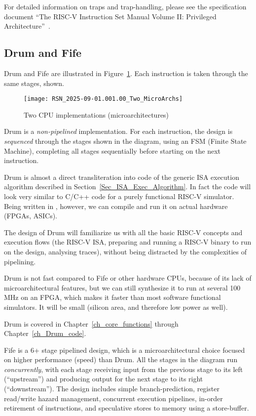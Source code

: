 For detailed information on traps and trap-handling, please see the
specification document ``The RISC-V Instruction Set Manual Volume II:
Privileged Architecture''~\cite{RISCV_Priv_2021_12_03}.


\subsection{Drum and Fife}

Drum and Fife are illustrated in
Figure~\ref{Fig_Two_Microarchitectures}.  Each instruction is taken
through the same stages, shown.
\begin{figure}[htbp]
  \centerline{\texttt{[image: RSN\_2025-09-01.001.00\_Two\_MicroArchs]}}
  \caption{\label{Fig_Two_Microarchitectures}Two CPU implementations (microarchitectures)}
\end{figure}

Drum is a \emph{non-pipelined} implementation.  For each instruction,
the design is \emph{sequenced} through the stages shown in the
diagram, using an FSM (Finite State Machine), completing all stages
sequentially before starting on the next instruction.

Drum is almost a direct transliteration into {\BSV} code of the generic
ISA execution algorithm described in
Section~\ref{Sec_ISA_Exec_Algorithm}.  In fact the {\BSV} code will look
very similar to C/C++ code for a purely functional RISC-V simulator.
Being written in {\BSV}, however, we can compile and run it on actual
hardware (FPGAs, ASICs).
       
The design of Drum will familiarize us with all the basic RISC-V
concepts and execution flows (the RISC-V ISA, preparing and running a
RISC-V binary to run on the design, analysing traces), without being
distracted by the complexities of pipelining.

Drum is not fast compared to Fife or other hardware CPUs, because of
its lack of microarchitectural features, but we can still synthesize
it to run at several 100 MHz on an FPGA, which makes it faster than
most software functional simulators.  It will be small (silicon area,
and therefore low power as well).

Drum is covered in Chapter~\ref{ch_core_functions} through
Chapter~\ref{ch_Drum_code}.

Fife is a 6+ stage pipelined design, which is a microarchitectural
choice focused on higher performance (speed) than Drum.  All the
stages in the diagram run \emph{concurrently}, with each stage
receiving input from the previous stage to its left (``upstream'') and
producing output for the next stage to its right (``downstream'').
The design includes simple branch-prediction, register read/write
hazard management, concurrent execution pipelines, in-order retirement
of instructions, and speculative stores to memory using a
store-buffer.

